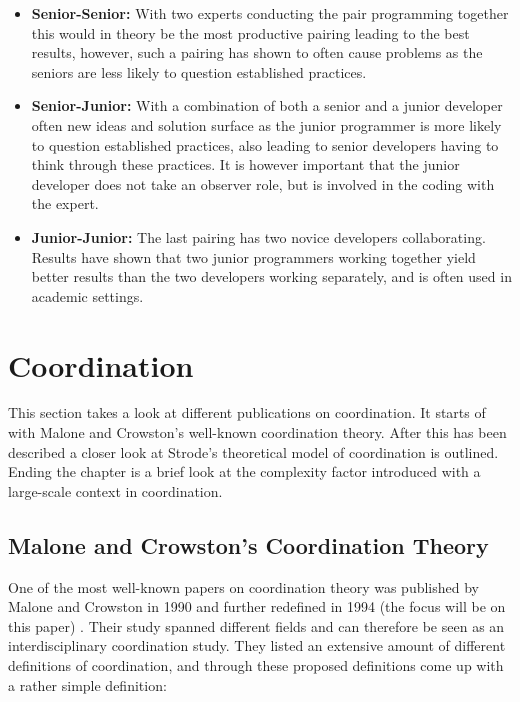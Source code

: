 \begin{itemize}
  \item \textbf{Senior-Senior:} With two experts conducting the pair programming together this would in theory be the most productive pairing leading to the best results, however, such a pairing has shown to often cause problems as the seniors are less likely to question established practices.
  \item \textbf{Senior-Junior:} With a combination of both a senior and a junior developer often new ideas and solution surface as the junior programmer is more likely to question established practices, also leading to senior developers having to think through these practices. It is however important that the junior developer does not take an observer role, but is involved in the coding with the expert.
  \item \textbf{Junior-Junior:} The last pairing has two novice developers collaborating. Results have shown that two junior programmers working together yield better results than the two developers working separately, and is often used in academic settings.
\end{itemize}

\section{Coordination}

This section takes a look at different publications on coordination. It starts of with Malone and Crowston's well-known coordination theory. After this has been described a closer look at Strode's theoretical model of coordination is outlined. Ending the chapter is a brief look at the complexity factor introduced with a large-scale context in coordination.

\subsection{Malone and Crowston's Coordination Theory}

One of the most well-known papers on coordination theory was published by Malone and Crowston in 1990 and further redefined in 1994 (the focus will be on this paper) \cite{Malone1994}. Their study spanned different fields and can therefore be seen as an interdisciplinary coordination study. They listed an extensive amount of different definitions of coordination, and through these proposed definitions come up with a rather simple definition:

